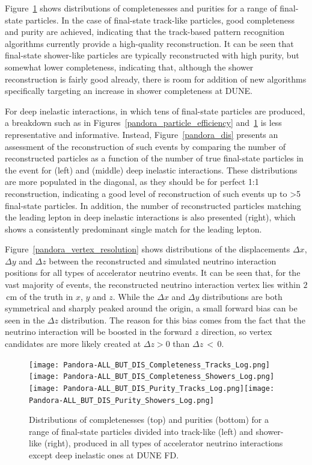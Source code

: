 Figure~\ref{pandora_completeness_purity} shows distributions of completenesses and purities for a range of final-state particles. In the case of final-state track-like particles, good completeness and purity are %
achieved, indicating that the track-based pattern recognition algorithms currently provide a high-quality reconstruction. It can be seen that final-state shower-like particles are typically reconstructed with high purity, but somewhat lower completeness, indicating that, although the shower reconstruction is fairly good already, there is room for addition of new algorithms specifically targeting an increase in shower completeness at DUNE.

For deep inelastic interactions, in which tens of final-state particles are produced, a breakdown such as in Figures~\ref{pandora_particle_efficiency} and~\ref{pandora_completeness_purity} is less representative and informative. Instead, Figure~\ref{pandora_dis} presents an assessment of the reconstruction of such events %
by comparing the number of reconstructed particles as a function of the number of true final-state particles in the event for  (left) and  (middle) deep inelastic interactions. These distributions are more populated in the diagonal, as they should be for perfect 1:1 reconstruction, indicating a good level of reconstruction of such events up to >5 final-state particles. In addition, the number of reconstructed particles matching the leading lepton in  deep inelastic interactions is also presented (right), which shows a consistently predominant single match for the leading lepton. 

Figure~\ref{pandora_vertex_resolution} shows distributions of the displacements $\Delta x$, $\Delta y$ and $\Delta z$ between the reconstructed and simulated neutrino interaction positions for all types of accelerator neutrino events. It can be seen that, for the vast majority of events, the reconstructed neutrino  interaction vertex lies within $2$\,cm of the  truth in $x$, $y$ and $z$. While the $\Delta x$ and $\Delta y$ distributions are both symmetrical and sharply peaked around the origin, a small forward bias can be seen in the $\Delta z$ distribution. The reason for this bias comes from the fact that the neutrino interaction will be boosted in the forward $z$ direction, so vertex candidates are more likely created at $\Delta z>0$ than $\Delta z\,<\,0$.  

\begin{figure}[!ht]
\centering
\texttt{[image: Pandora-ALL\_BUT\_DIS\_Completeness\_Tracks\_Log.png]}\texttt{[image: Pandora-ALL\_BUT\_DIS\_Completeness\_Showers\_Log.png]}
\texttt{[image: Pandora-ALL\_BUT\_DIS\_Purity\_Tracks\_Log.png]}\texttt{[image: Pandora-ALL\_BUT\_DIS\_Purity\_Showers\_Log.png]}
\caption[Completeness (top) and purities (bottom) for a range of final-state track-like  and shower-like particles]{Distributions of completenesses (top) and purities (bottom) for a range of final-state particles divided into track-like (left) and shower-like (right), produced in all types of accelerator neutrino interactions except deep inelastic ones at DUNE FD. }
\label{pandora_completeness_purity}
\end{figure}

